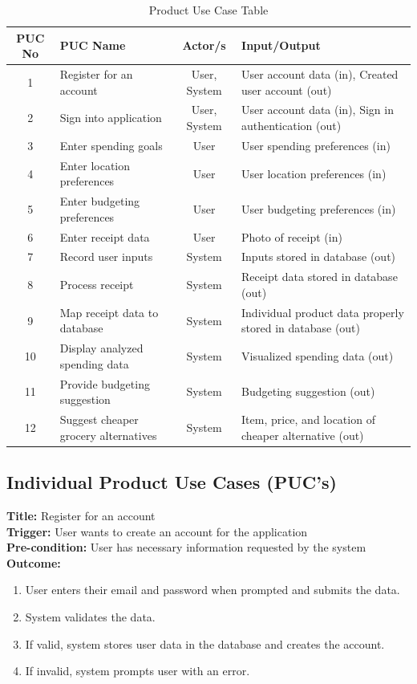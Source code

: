 \documentclass[12pt]{article}
\begin{document}
\begin{table}[H]
  \centering
  \begin{tabular}{ |c|p{3.5cm}|c|p{3.5cm}| } 
  \hline
  \textbf{PUC No} & \textbf{PUC Name} & \textbf{Actor/s} & \textbf{Input/Output} \\ 
  \hline
  1 & Register for an account & User, System & User account data (in), Created user account (out) \\
  \hline
  2 & Sign into application & User, System & User account data (in), Sign in authentication (out) \\
  \hline
  3 & Enter spending goals & User & User spending preferences (in) \\
  \hline
  4 & Enter location preferences & User & User location preferences (in) \\
  \hline
  5 & Enter budgeting preferences & User & User budgeting preferences (in) \\
  \hline
  6 & Enter receipt data & User & Photo of receipt (in) \\
  \hline
  7 & Record user inputs & System & Inputs stored in database (out) \\
  \hline
  8 & Process receipt & System & Receipt data stored in database (out) \\
  \hline
  9 & Map receipt data to database & System & Individual product data properly stored in database (out) \\
  \hline
  10 & Display analyzed spending data & System & Visualized spending data (out) \\
  \hline
  11 & Provide budgeting suggestion & System & Budgeting suggestion (out) \\
  \hline
  12 & Suggest cheaper grocery alternatives & System & Item, price, and location of cheaper alternative (out) \\
  \hline
  \end{tabular}
  \caption{Product Use Case Table}
  \label{tab:productusecasetable}
\end{table}

\pagebreak
\subsection{Individual Product Use Cases (PUC's)}

\textbf{Title:} Register for an account\\
\textbf{Trigger:} User wants to create an account for the application\\
\textbf{Pre-condition:} User has necessary information requested by the system\\
\textbf{Outcome:}
\begin{enumerate}
  \item User enters their email and password when prompted and submits the data.
  \item System validates the data.
  \item If valid, system stores user data in the database and creates the account.
  \item If invalid, system prompts user with an error.
\end{enumerate}
\end{document}
